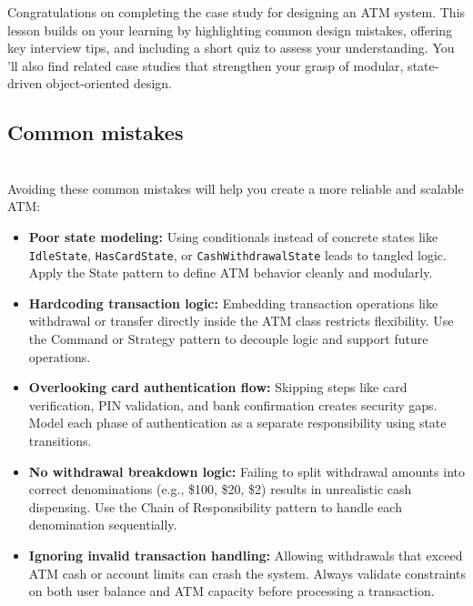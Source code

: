 

Congratulations on completing the case study for designing an ATM system. This lesson builds on your learning by highlighting common design mistakes, offering key interview tips, and including a short quiz to assess your understanding. You 'll also find related case studies that strengthen your grasp of modular, state-driven object-oriented design.

\subsection{Common mistakes}\label{kVSrEzFQ2p771ydpCzKzo}
\\
Avoiding these common mistakes will help you create a more reliable and scalable ATM:

\begin{itemize}
\item
\protect{}\label{K9cnX4ttffmRLIzSDFrvo}
\textbf{Poor state modeling:} Using conditionals instead of concrete states like \texttt{IdleState}, \texttt{HasCardState}, or \texttt{CashWithdrawalState} leads to tangled logic. Apply the State pattern to define ATM behavior cleanly and modularly.
\item
\protect{}\label{GMb0JOYsSC-Uuh2keJTMM}
\textbf{Hardcoding transaction logic:} Embedding transaction operations like withdrawal or transfer directly inside the ATM class restricts flexibility. Use the Command or Strategy pattern to decouple logic and support future operations.
\item
\protect{}\label{rboVdC1fGquEFZjcY6GXl}
\textbf{Overlooking card authentication flow:} Skipping steps like card verification, PIN validation, and bank confirmation creates security gaps. Model each phase of authentication as a separate responsibility using state transitions.
\item
\protect{}\label{uZ8L-ZaVcfMEy-SoFN-AA}
\textbf{No withdrawal breakdown logic:} Failing to split withdrawal amounts into correct denominations (e.g., \$100, \$20, \$2) results in unrealistic cash dispensing. Use the Chain of Responsibility pattern to handle each denomination sequentially.
\item
\protect{}\label{o8yYYCnBzFw95nOGb66vi}
\textbf{Ignoring invalid transaction handling:} Allowing withdrawals that exceed ATM cash or account limits can crash the system. Always validate constraints on both user balance and ATM capacity before processing a transaction.
\end{itemize}

